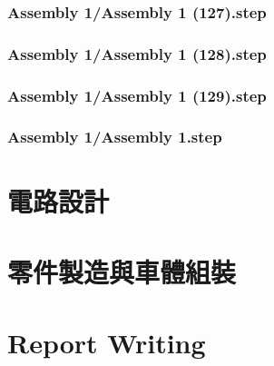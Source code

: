 \documentclass[a4paper,12pt]{article}
\begin{document}
\subsubsection{Assembly 1/Assembly 1 (127).step}

\subsubsection{Assembly 1/Assembly 1 (128).step}

\subsubsection{Assembly 1/Assembly 1 (129).step}

\subsubsection{Assembly 1/Assembly 1.step}


\section{電路設計}

\section{零件製造與車體組裝}

\section{Report Writing}
\end{document}
